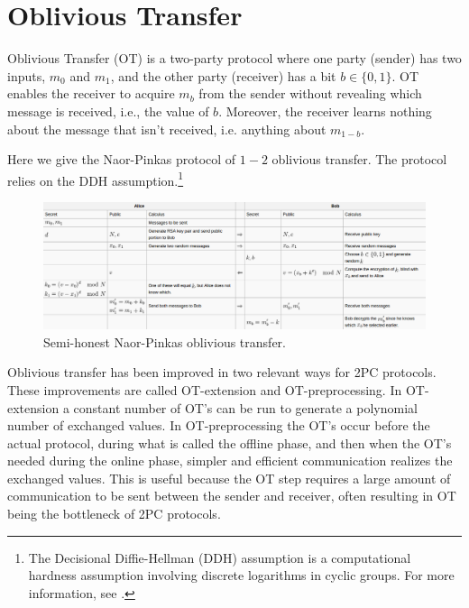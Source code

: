 \section{Oblivious Transfer}
Oblivious Transfer (OT) is a two-party protocol where one party (sender) has two inputs, $m_0$ and $m_1$, and the other party (receiver) has a bit $b \in \{0,1\}$. 
OT enables the receiver to acquire $m_b$ from the sender without revealing which message is received, i.e., the value of $b$.
Moreover, the receiver learns nothing about the message that isn't received, i.e. anything about $m_{1-b}$.

Here we give the Naor-Pinkas protocol of $1-2$ oblivious transfer.
The protocol relies on the DDH assumption.\footnote{The Decisional Diffie-Hellman (DDH) assumption is a computational hardness assumption involving discrete logarithms in cyclic groups. For more information, see \cite{Boneh1998}.}


\begin{figure}
    \centering
    \includegraphics[scale=0.3]{images/ot_wiki}
    \caption{Semi-honest Naor-Pinkas oblivious transfer.}
\end{figure}

Oblivious transfer has been improved in two relevant ways for 2PC protocols. 
These improvements are called OT-extension and OT-preprocessing. 
In OT-extension a constant number of OT's can be run to generate a polynomial number of exchanged values.
In OT-preprocessing the OT's occur before the actual protocol, during what is called the offline phase, and then when the OT's needed during the online phase, simpler and efficient communication realizes the exchanged values.
This is useful because the OT step requires a large amount of communication to be sent between the sender and receiver, often resulting in OT being the bottleneck of 2PC protocols.
